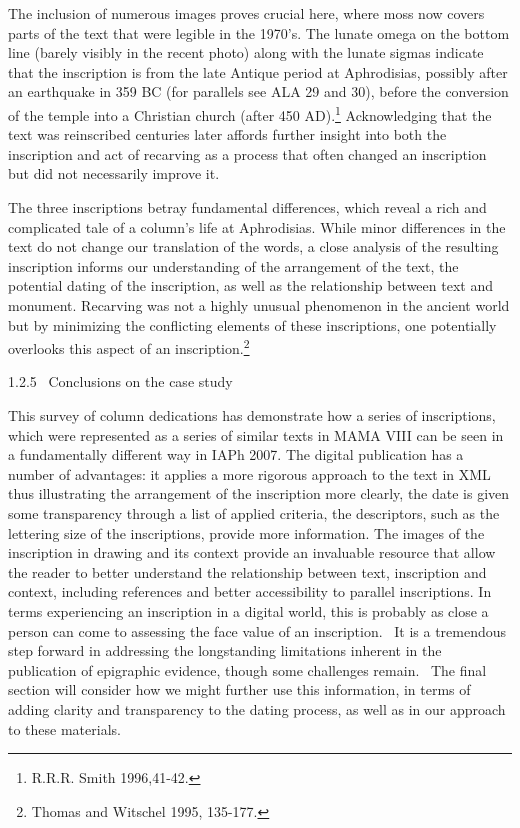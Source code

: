 \documentclass[amsthm,ebook]{saparticle}
\begin{document}
The inclusion of numerous images proves crucial here, where moss now covers parts of the text that were legible in the
1970’s. The lunate omega on the bottom line (barely visibly in the recent photo) along with the lunate sigmas indicate
that the inscription is from the late Antique period at Aphrodisias, possibly after an earthquake in 359 BC (for
parallels see ALA 29 and 30), before the conversion of the temple into a Christian church (after 450 AD).\footnote{
R.R.R. Smith 1996,41-42.} Acknowledging that the text was reinscribed centuries later affords further insight into both
the inscription and act of recarving as a process that often changed an inscription but did not necessarily improve it.



\bigskip

The three inscriptions betray fundamental differences, which reveal a rich and complicated tale of a column’s life at
Aphrodisias. While minor differences in the text do not change our translation of the words, a close analysis of the
resulting inscription informs our understanding of the arrangement of the text, the potential dating of the
inscription, as well as the relationship between text and monument. Recarving was not a highly unusual phenomenon in
the ancient world but by minimizing the conflicting elements of these inscriptions, one potentially overlooks this
aspect of an inscription.\footnote{ Thomas and Witschel 1995, 135-177. } 


\bigskip

1.2.5 \ Conclusions on the case study


\bigskip

This survey of column dedications has demonstrate how a series of inscriptions, which were represented as a series of
similar texts in MAMA VIII can be seen in a fundamentally different way in IAPh 2007. The digital publication has a
number of advantages: it applies a more rigorous approach to the text in XML thus illustrating the arrangement of the
inscription more clearly, the date is given some transparency through a list of applied criteria, the descriptors, such
as the lettering size of the inscriptions, provide more information. The images of the inscription in drawing and its
context provide an invaluable resource that allow the reader to better understand the relationship between text,
inscription and context, including references and better accessibility to parallel inscriptions. In terms experiencing
an inscription in a digital world, this is probably as close a person can come to assessing the face value of an
inscription. \ It is a tremendous step forward in addressing the longstanding limitations inherent in the publication
of epigraphic evidence, though some challenges remain. \ The final section will consider how we might further use this
information, in terms of adding clarity and transparency to the dating process, as well as in our approach to these
materials. \ 
\end{document}
